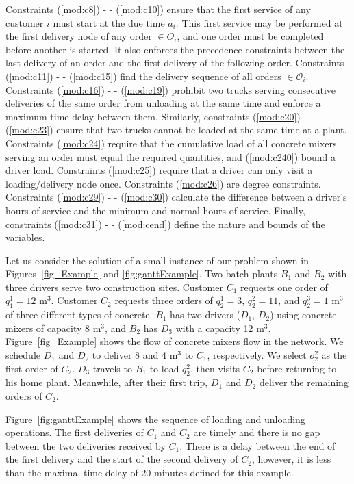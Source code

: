 \documentclass{article}
\begin{document}
Constraints (\ref{mod:c8}) - - (\ref{mod:c10}) ensure that the first service of any customer $i$ must start at the due time $a_i$. This first service may be performed at the first delivery node of any order $\in O_i$, and one order must be completed before another is started. It also enforces the precedence constraints between the last delivery of an order and the first delivery of the following order.
Constraints (\ref{mod:c11}) - - (\ref{mod:c15}) find the delivery sequence of all orders $\in \mathcal{O}_i$. Constraints (\ref{mod:c16}) - - (\ref{mod:c19}) prohibit two trucks serving consecutive deliveries of the same order from unloading at the same time and enforce a maximum time delay between them. Similarly, constraints (\ref{mod:c20}) - - (\ref{mod:c23}) ensure that two trucks cannot be loaded at the same time at a plant. Constraints (\ref{mod:c24}) require that the cumulative load of all concrete mixers serving an order must equal the required quantities, and (\ref{mod:c240}) bound a driver load.  Constraints (\ref{mod:c25}) require that a driver can only visit a loading/delivery node once. Constraints (\ref{mod:c26}) are degree constraints. Constraints (\ref{mod:c29}) - - (\ref{mod:c30}) calculate the difference between a driver's hours of service and the minimum and normal hours of service. Finally, constraints (\ref{mod:c31}) - - (\ref{mod:cend}) define the nature and bounds of the variables.

Let us consider the solution of a small instance of our problem shown in Figures~\ref{fig_Example} and \ref{fig:ganttExample}. Two batch plants $B_1$ and $B_2$ with three drivers serve two construction sites. Customer $C_1$ requests one order of $q^1_1=12$ m$^3$. Customer $C_2$ requests three orders of $q^1_2=3$, $q^2_2=11$, and $q^3_2=1$ m$^3$ of three different types of concrete. $B_1$ has two drivers ($D_1$, $D_2$) using concrete mixers of capacity 8 m$^3$, and $B_2$ has $D_3$ with a capacity 12 m$^3$. Figure~\ref{fig_Example} shows the flow of concrete mixers flow in the network. We schedule $D_1$ and $D_2$ to deliver 8 and 4 m$^3$ to $C_1$, respectively. We select $o^2_2$ as the first order of $C_2$. $D_3$ travels to $B_1$ to load $q^2_2$, then visits $C_2$ before returning to his home plant. Meanwhile, after their first trip,  $D_1$ and $D_2$ deliver the remaining orders of $C_2$.

Figure~\ref{fig:ganttExample} shows the sequence of loading and unloading operations. The first deliveries of $C_1$ and $C_2$ are timely and there is no gap between the two deliveries received by $C_1$. There is a delay between the end of the first delivery and the start of the second delivery of $C_2$, however, it is less than the maximal time delay of 20 minutes defined for this example.
\end{document}
